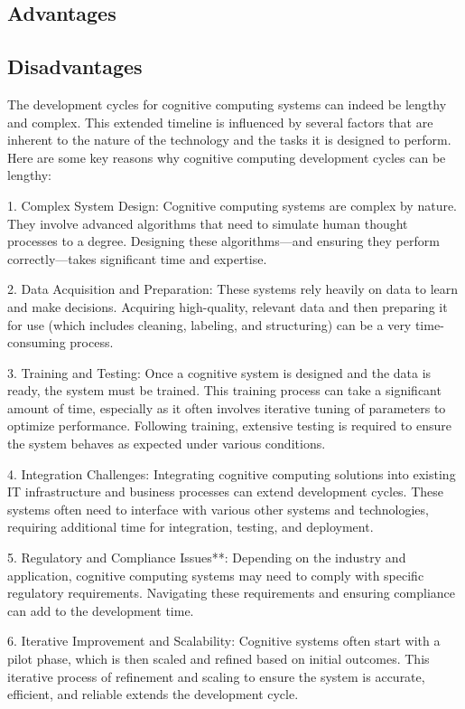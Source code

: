 \documentclass{article}
\begin{document}
\subsection{Advantages}

\subsection{Disadvantages}
The development cycles for cognitive computing systems can indeed be lengthy and complex. This extended timeline is influenced by several factors that are inherent to the nature of the technology and the tasks it is designed to perform. Here are some key reasons why cognitive computing development cycles can be lengthy:

1. Complex System Design: Cognitive computing systems are complex by nature. They involve advanced algorithms that need to simulate human thought processes to a degree. Designing these algorithms—and ensuring they perform correctly—takes significant time and expertise.

2. Data Acquisition and Preparation: These systems rely heavily on data to learn and make decisions. Acquiring high-quality, relevant data and then preparing it for use (which includes cleaning, labeling, and structuring) can be a very time-consuming process.

3. Training and Testing: Once a cognitive system is designed and the data is ready, the system must be trained. This training process can take a significant amount of time, especially as it often involves iterative tuning of parameters to optimize performance. Following training, extensive testing is required to ensure the system behaves as expected under various conditions.

4. Integration Challenges: Integrating cognitive computing solutions into existing IT infrastructure and business processes can extend development cycles. These systems often need to interface with various other systems and technologies, requiring additional time for integration, testing, and deployment.

5. Regulatory and Compliance Issues**: Depending on the industry and application, cognitive computing systems may need to comply with specific regulatory requirements. Navigating these requirements and ensuring compliance can add to the development time.

6. Iterative Improvement and Scalability: Cognitive systems often start with a pilot phase, which is then scaled and refined based on initial outcomes. This iterative process of refinement and scaling to ensure the system is accurate, efficient, and reliable extends the development cycle.
\end{document}
